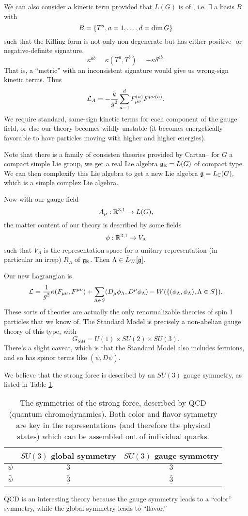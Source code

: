We can also consider a kinetic term provided that $L(G)$ is of , i.e. $\exists$ a basis $B$ with
$$B=\{T^a, a=1,\ldots, d=\dim G\}$$
such that the Killing form is not only non-degenerate but has either positive- or negative-definite signature,
$$\kappa^{ab}=\kappa(T^a,T^b)=-\kappa \delta^{ab}.$$
That is, a ``metric'' with an inconsistent signature would give us wrong-sign kinetic terms. Thus
$$\mathcal L_A=-\frac{k}{g^2}\sum_{a=1}^d F_{\mu\nu}^{(a)} F^{\mu\nu (a)}.$$
We require standard, same-sign kinetic terms for each component of the gauge field, or else our theory becomes wildly unstable (it becomes energetically favorable to have particles moving with higher and higher energies).

Note that there is a family of consisten theories provided by Cartan-- for $G$ a compact simple Lie group, we get a real Lie algebra $\mathfrak{g}_{\mathbb{R}} = L(G)$ of compact type. We can then complexify this Lie algebra to get a new Lie algebra $\mathfrak{g} = L_{\mathbb{C}}(G),$ which is a simple complex Lie algebra.

Now with our gauge field
$$A_\mu: \mathbb{R}^{3,1}\to L(G),$$
the matter content of our theory is described by some fields
$$\phi:\mathbb{R}^{3,1}\to V_\Lambda$$
such that $V_{\Lambda}$ is the representation space for a unitary representation (in particular an irrep) $R_\Lambda$ of $\mathfrak{g}_{\mathbb{R}}$. Then $\Lambda \in \bar L_W[\mathfrak{g}].$

Our new Lagrangian is
$$\mathcal L=\frac{1}{g^2}\kappa(F_{\mu\nu},F^{\mu\nu})+\sum_{\Lambda\in S}(D_\mu \phi_\Lambda, D^\mu \phi_\Lambda) - W(\{(\phi_\Lambda,\phi_\Lambda),\Lambda \in S\}).$$
These sorts of theories are actually the only renormalizable theories of spin 1 particles that we know of. The Standard Model is precisely a non-abelian gauge theory of this type, with
$$G_{SM}=U(1)\times SU(2)\times SU(3).$$
There's a slight caveat, which is that the Standard Model also includes fermions, and so has spinor terms like $(\bar \psi, D\psi)$.%

We believe that the strong force is described by an $SU(3)$ gauge symmetry, as listed in Table \ref{tab:qcd}.
\begin{table}[]
    \centering
    \begin{tabular}{c c|c}
         & $SU(3)$ global symmetry & $SU(3)$ gauge symmetry\\\hline
         $\psi$ & $\underline{3}$ & $\underline{3}$\\
         $\bar \psi$ & $\underline{\overline{3}}$ & $\underline{\overline{3}}$\\
    \end{tabular}
    \caption{The symmetries of the strong force, described by QCD (quantum chromodynamics). Both color and flavor symmetry are key in the representations (and therefore the physical states) which can be assembled out of individual quarks.}
    \label{tab:qcd}
\end{table}
QCD is an interesting theory because the gauge symmetry leads to a ``color'' symmetry, while the global symmetry leads to ``flavor.'' 

